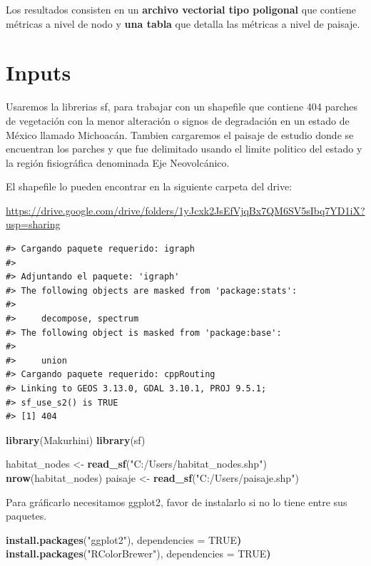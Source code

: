 \documentclass[
]{book}
\newenvironment{Shaded}{\begin{snugshade}}{\end{snugshade}}
\newcommand{\ConstantTok}[1]{\textcolor[rgb]{0.56,0.35,0.01}{#1}}
\newcommand{\ErrorTok}[1]{\textcolor[rgb]{0.64,0.00,0.00}{\textbf{#1}}}
\newcommand{\FunctionTok}[1]{\textcolor[rgb]{0.13,0.29,0.53}{\textbf{#1}}}
\newcommand{\NormalTok}[1]{#1}
\newcommand{\OtherTok}[1]{\textcolor[rgb]{0.56,0.35,0.01}{#1}}
\newcommand{\StringTok}[1]{\textcolor[rgb]{0.31,0.60,0.02}{#1}}
\begin{document}
Los resultados consisten en un \textbf{archivo vectorial tipo poligonal} que contiene métricas a nivel de nodo y \textbf{una tabla} que detalla las métricas a nivel de paisaje.

\section{Inputs}\label{inputs}

Usaremos la librerias sf, para trabajar con un shapefile que contiene 404 parches de vegetación con la menor alteración o signos de degradación en un estado de México llamado Michoacán. Tambien cargaremos el paisaje de estudio donde se encuentran los parches y que fue delimitado usando el limite politico del estado y la región fisiográfica denominada Eje Neovolcánico.

El shapefile lo pueden encontrar en la siguiente carpeta del drive:

\url{https://drive.google.com/drive/folders/1yJcxk2JsEfVjqBx7QM6SV5sIbq7YD1iX?usp=sharing}

\begin{verbatim}
#> Cargando paquete requerido: igraph
#> 
#> Adjuntando el paquete: 'igraph'
#> The following objects are masked from 'package:stats':
#> 
#>     decompose, spectrum
#> The following object is masked from 'package:base':
#> 
#>     union
#> Cargando paquete requerido: cppRouting
#> Linking to GEOS 3.13.0, GDAL 3.10.1, PROJ 9.5.1;
#> sf_use_s2() is TRUE
#> [1] 404
\end{verbatim}

\begin{Shaded}
\begin{Highlighting}[]
\FunctionTok{library}\NormalTok{(Makurhini)}
\FunctionTok{library}\NormalTok{(sf)}

\NormalTok{habitat\_nodes }\OtherTok{\textless{}{-}} \FunctionTok{read\_sf}\NormalTok{(}\StringTok{"C:/Users/habitat\_nodes.shp"}\NormalTok{)}
\FunctionTok{nrow}\NormalTok{(habitat\_nodes)}
\NormalTok{paisaje }\OtherTok{\textless{}{-}} \FunctionTok{read\_sf}\NormalTok{(}\StringTok{"C:/Users/paisaje.shp"}\NormalTok{)}
\end{Highlighting}
\end{Shaded}

Para gráficarlo necesitamos ggplot2, favor de instalarlo si no lo tiene entre sus paquetes.

\begin{Shaded}
\begin{Highlighting}[]
\FunctionTok{install.packages}\NormalTok{(}\StringTok{"ggplot2"}\NormalTok{), dependencies }\OtherTok{=} \ConstantTok{TRUE}\ErrorTok{)}
\FunctionTok{install.packages}\NormalTok{(}\StringTok{"RColorBrewer"}\NormalTok{), dependencies }\OtherTok{=} \ConstantTok{TRUE}\ErrorTok{)}
\end{Highlighting}
\end{Shaded}
\end{document}
